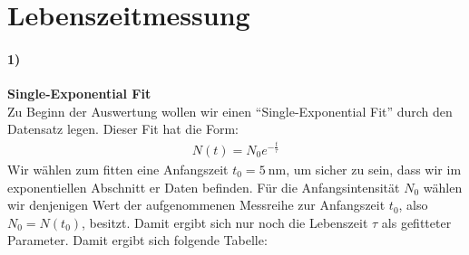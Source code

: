 \newpage
\section{Lebenszeitmessung}
\label{sec:lebenszeit}
\paragraph{1)}\textbf{Single-Exponential Fit}\\
Zu Beginn der Auswertung wollen wir einen \enquote{Single-Exponential Fit} durch den Datensatz legen. Dieser Fit hat die Form:
\begin{gather}
    N(t) = N_0e^{-\frac{t}{\tau}}
\end{gather}
Wir wählen zum fitten eine Anfangszeit $t_{0}=\SI{5}{\nano\metre}$, um sicher zu sein, dass wir im exponentiellen Abschnitt er Daten befinden. Für die Anfangsintensität $N_0$ wählen wir denjenigen Wert der aufgenommenen Messreihe zur Anfangszeit $t_{0}$, also $N_0=N(t_{0})$, besitzt. Damit ergibt sich nur noch die Lebenszeit $\tau$ als gefitteter Parameter. Damit ergibt sich folgende Tabelle:
